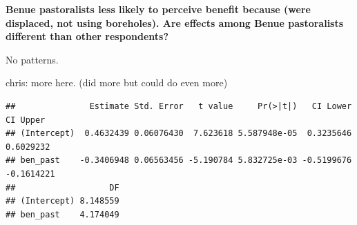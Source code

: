 \documentclass[
]{article}
\newenvironment{Shaded}{\begin{snugshade}}{\end{snugshade}}
\newcommand{\AttributeTok}[1]{\textcolor[rgb]{0.77,0.63,0.00}{#1}}
\newcommand{\CommentTok}[1]{\textcolor[rgb]{0.56,0.35,0.01}{\textit{#1}}}
\newcommand{\DecValTok}[1]{\textcolor[rgb]{0.00,0.00,0.81}{#1}}
\newcommand{\DocumentationTok}[1]{\textcolor[rgb]{0.56,0.35,0.01}{\textbf{\textit{#1}}}}
\newcommand{\FunctionTok}[1]{\textcolor[rgb]{0.00,0.00,0.00}{#1}}
\newcommand{\NormalTok}[1]{#1}
\newcommand{\OtherTok}[1]{\textcolor[rgb]{0.56,0.35,0.01}{#1}}
\newcommand{\SpecialCharTok}[1]{\textcolor[rgb]{0.00,0.00,0.00}{#1}}
\newcommand{\StringTok}[1]{\textcolor[rgb]{0.31,0.60,0.02}{#1}}
\begin{document}
\textbf{Benue pastoralists less likely to perceive benefit because (were
displaced, not using boreholes). Are effects among Benue pastoralists
different than other respondents?}

No patterns.

chris: more here. (did more but could do even more)

\begin{Shaded}
\end{Shaded}

\begin{verbatim}
##               Estimate Std. Error   t value     Pr(>|t|)   CI Lower   CI Upper
## (Intercept)  0.4632439 0.06076430  7.623618 5.587948e-05  0.3235646  0.6029232
## ben_past    -0.3406948 0.06563456 -5.190784 5.832725e-03 -0.5199676 -0.1614221
##                   DF
## (Intercept) 8.148559
## ben_past    4.174049
\end{verbatim}

\begin{Shaded}
\end{Shaded}
\end{document}
